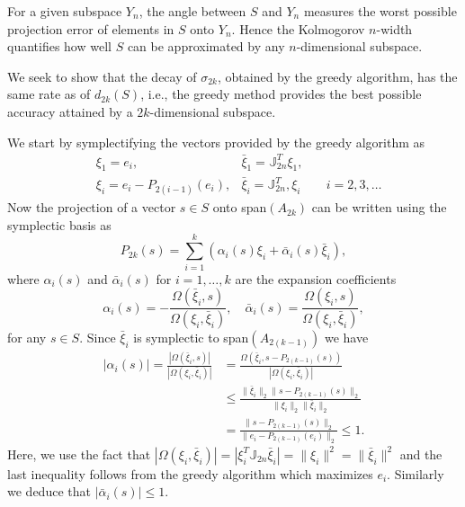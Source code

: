 For a given subspace $Y_n$, the angle between $S$ and $Y_n$ measures the worst possible projection error of elements in $S$ onto $Y_n$. Hence the Kolmogorov $n$-width quantifies how well $S$ can be approximated by any $n$-dimensional subspace. 

We seek to show that the decay of $\sigma_{2k}$, obtained by the greedy algorithm, has the same rate as of $d_{2k}(S)$, i.e., the greedy method provides the best possible accuracy attained by a $2k$-dimensional subspace.

We start by symplectifying the vectors provided by the greedy algorithm as
\begin{equation} \label{eq:new6}
\begin{aligned}
	& \xi_1 = e_i, & \bar{\xi}_1 = \mathbb{J}_{2n}^T \xi_1, &\\
	& \xi_i = e_i - P_{2(i-1)} (e_i), & \bar{\xi}_i = \mathbb{J}_{2n}^T, \xi_i &\quad i = 2,3,\dots
\end{aligned}
\end{equation}
Now the projection of a vector $s\in S$ onto span$(A_{2k})$ can be written using the symplectic basis as
\begin{equation} \label{eq:new7}
	P_{2k}(s) = \sum_{i=1}^k \left( \alpha_i(s) \xi_i + \bar{\alpha}_i(s) \bar{\xi}_i \right),
\end{equation}
where $\alpha_i(s)$ and $\bar{\alpha}_i(s)$ for $i=1,\dots,k$ are the expansion coefficients
\begin{equation} \label{eq:new8}
	\alpha_i(s) = - \frac{\Omega(\bar{\xi}_i,s)}{\Omega(\xi_i,\bar{\xi}_i)}, \quad \bar{\alpha}_i(s) = \frac{\Omega(\xi_i,s)}{\Omega(\xi_i,\bar{\xi}_i)},
\end{equation}
for any $s\in S$. Since $\bar{\xi}_i$ is symplectic to span$(A_{2(k-1)})$ we have
\begin{equation} \label{eq:new9}
\begin{aligned}
	|\alpha_i(s)| = \frac{|\Omega(\bar{\xi}_i,s)|}{|\Omega(\xi_i,\bar{\xi}_i)|} &= \frac{\Omega( \bar{\xi}_i, s - P_{2(k-1)}(s))}{|\Omega(\xi_i,\bar{\xi}_i)|} \\
	&\leq \frac{\|\bar{\xi}_i\|_2 \| s - P_{2(k-1)}(s) \|_2}{ \|\xi_i\|_2 \|\bar{\xi}_i\|_2 } \\
	&= \frac{\| s - P_{2(k-1)}(s) \|_2}{\| e_i - P_{2(k-1)}(e_i) \|_2} \leq 1.
\end{aligned}
\end{equation}
Here, we use the fact that $|\Omega(\xi_i,\bar{\xi}_i)| = |\xi_i^T \mathbb{J}_{2n}\bar{\xi}_i| = \| \xi_i \|^2 = \|\bar{\xi}_i\|^2$ and the last inequality follows from the greedy algorithm which maximizes $e_i$. Similarly we deduce that $|\bar{\alpha}_i(s)|\leq 1$.

